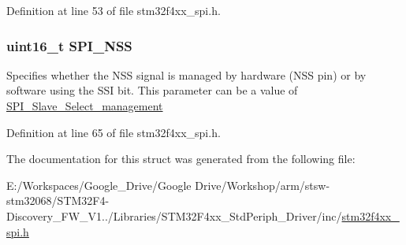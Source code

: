 Definition at line 53 of file stm32f4xx\-\_\-spi.\-h.

\hypertarget{struct_s_p_i___init_type_def_a046014c02b6456fd153ea81077e42ab6}{
\subsubsection[{S\-P\-I\-\_\-\-N\-S\-S}]{\setlength{\rightskip}{0pt plus 5cm}uint16\-\_\-t S\-P\-I\-\_\-\-N\-S\-S}}\label{struct_s_p_i___init_type_def_a046014c02b6456fd153ea81077e42ab6}
Specifies whether the N\-S\-S signal is managed by hardware (N\-S\-S pin) or by software using the S\-S\-I bit. This parameter can be a value of \hyperlink{group___s_p_i___slave___select__management}{S\-P\-I\-\_\-\-Slave\-\_\-\-Select\-\_\-management} 

Definition at line 65 of file stm32f4xx\-\_\-spi.\-h.



The documentation for this struct was generated from the following file\-:\begin{DoxyCompactItemize}
\item 
E\-:/\-Workspaces/\-Google\-\_\-\-Drive/\-Google Drive/\-Workshop/arm/stsw-\/stm32068/\-S\-T\-M32\-F4-\/\-Discovery\-\_\-\-F\-W\-\_\-\-V1../\-Libraries/\-S\-T\-M32\-F4xx\-\_\-\-Std\-Periph\-\_\-\-Driver/inc/\hyperlink{stm32f4xx__spi_8h}{stm32f4xx\-\_\-spi.\-h}\end{DoxyCompactItemize}
